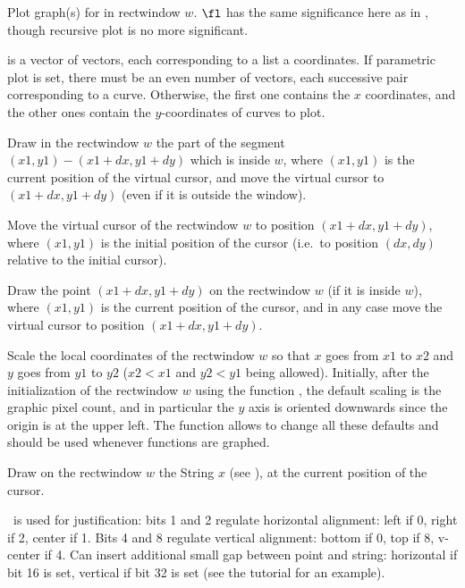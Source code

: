 \label{se:plotrecthraw}
Plot graph(s) for
 in rectwindow $w$. $\fl$ has the same significance here as in
, though recursive plot is no more significant.

 is a vector of vectors, each corresponding to a list a coordinates.
If parametric plot is set, there must be an even number of vectors, each
successive pair corresponding to a curve. Otherwise, the first one contains
the $x$ coordinates, and the other ones contain the $y$-coordinates
of curves to plot.

\label{se:plotrline}
Draw in the rectwindow $w$ the part of the segment
$(x1,y1)-(x1+dx,y1+dy)$ which is inside $w$, where $(x1,y1)$ is the current
position of the virtual cursor, and move the virtual cursor to
$(x1+dx,y1+dy)$ (even if it is outside the window).

\label{se:plotrmove}
Move the virtual cursor of the rectwindow $w$ to position
$(x1+dx,y1+dy)$, where $(x1,y1)$ is the initial position of the cursor
(i.e.~to position $(dx,dy)$ relative to the initial cursor).

\label{se:plotrpoint}
Draw the point $(x1+dx,y1+dy)$ on the rectwindow $w$ (if it is inside
$w$), where $(x1,y1)$ is the current position of the cursor, and in any case
move the virtual cursor to position $(x1+dx,y1+dy)$.

\label{se:plotscale}
Scale the local coordinates of the rectwindow $w$ so that $x$ goes from
$x1$ to $x2$ and $y$ goes from $y1$ to $y2$ ($x2<x1$ and $y2<y1$ being
allowed). Initially, after the initialization of the rectwindow $w$ using
the function , the default scaling is the graphic pixel count,
and in particular the $y$ axis is oriented downwards since the origin is at
the upper left. The function  allows to change all these
defaults and should be used whenever functions are graphed.

\label{se:plotstring}
Draw on the rectwindow $w$ the String $x$ (see ), at
the current position of the cursor.

\fl\ is used for justification: bits 1 and 2 regulate horizontal alignment:
left if 0, right if 2, center if 1. Bits 4 and 8 regulate vertical
alignment: bottom if 0, top if 8, v-center if 4. Can insert additional small
gap between point and string: horizontal if bit 16 is set, vertical if bit
32 is set (see the tutorial for an example).

